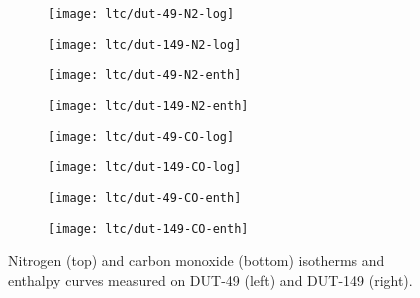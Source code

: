 \begin{figure}[p]
    \centering
    \begin{subfigure}{0.43\linewidth}
        \texttt{[image: ltc/dut-49-N2-log]}%
    \end{subfigure}%
    \begin{subfigure}{0.43\linewidth}
        \texttt{[image: ltc/dut-149-N2-log]}%
    \end{subfigure}%

    \begin{subfigure}{0.43\linewidth}
        \texttt{[image: ltc/dut-49-N2-enth]}%
    \end{subfigure}%
    \begin{subfigure}{0.43\linewidth}
        \texttt{[image: ltc/dut-149-N2-enth]}%
    \end{subfigure}%

    \begin{subfigure}{0.43\linewidth}
        \texttt{[image: ltc/dut-49-CO-log]}%
    \end{subfigure}%
    \begin{subfigure}{0.43\linewidth}
        \texttt{[image: ltc/dut-149-CO-log]}%
    \end{subfigure}%

    \begin{subfigure}{0.43\linewidth}
        \texttt{[image: ltc/dut-49-CO-enth]}%
    \end{subfigure}%
    \begin{subfigure}{0.43\linewidth}
        \texttt{[image: ltc/dut-149-CO-enth]}%
    \end{subfigure}%

    \caption{Nitrogen (top) and carbon monoxide (bottom) isotherms and 
    enthalpy curves measured on DUT-49 (left) and DUT-149 (right).}
    \label{dut:fgr:dut-ltc-comp1}
\end{figure}

